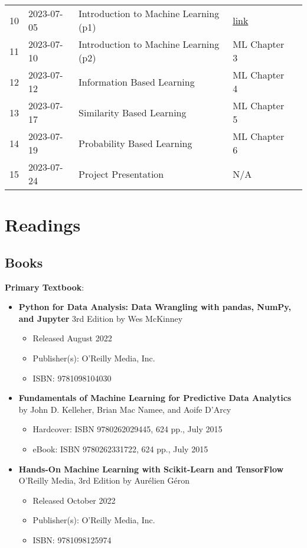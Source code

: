 \documentclass{article}
\begin{document}
\begin{center}
\begin{tabular}{lllll}
10       & 2023-07-05 & Introduction to Machine Learning (p1) & \href{https://github.com/xiangshiyin/data-programming-with-python/tree/main/2023-summer/2023-07-05}{link}\\
11       & 2023-07-10 & Introduction to Machine Learning (p2) & ML Chapter 3\\
12       & 2023-07-12 & Information Based Learning             & ML Chapter 4\\
13       & 2023-07-17 & Similarity Based Learning            & ML Chapter 5\\
14       & 2023-07-19 & Probability Based Learning                  & ML Chapter 6\\
15       & 2023-07-24 & Project Presentation                  &N/A\\
\hline        
\end{tabular}
\end{center}


\section{Readings}
\subsection{Books}
\textbf{Primary Textbook}:
  \begin{itemize}
    \item \textbf{Python for Data Analysis: Data Wrangling with pandas, NumPy, and Jupyter} 3rd Edition by Wes McKinney
    \begin{itemize}
        \item Released August 2022
        \item Publisher(s): O'Reilly Media, Inc.
        \item ISBN: 9781098104030
    \end{itemize}  
  \end{itemize}
  \begin{itemize}
    \item \textbf{Fundamentals of Machine Learning for Predictive Data Analytics} by John D. Kelleher, Brian Mac Namee, and Aoife D’Arcy
    \begin{itemize}
        \item Hardcover: ISBN 9780262029445, 624 pp., July 2015
        \item eBook: ISBN 9780262331722, 624 pp., July 2015
    \end{itemize} 
  \end{itemize}
  \begin{itemize}
  	\item \textbf{Hands-On Machine Learning with Scikit-Learn and TensorFlow} O'Reilly Media, 3rd Edition by Aurélien Géron
  	\begin{itemize}
        \item Released October 2022
        \item Publisher(s): O'Reilly Media, Inc.
        \item ISBN: 9781098125974
    \end{itemize}
  \end{itemize}
\end{document}
